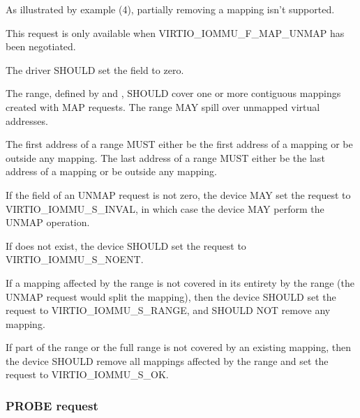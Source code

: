As illustrated by example (4), partially removing a mapping isn't
supported.

This request is only available when VIRTIO_IOMMU_F_MAP_UNMAP has been
negotiated.


The driver SHOULD set the  field to zero.

The range, defined by  and , SHOULD
cover one or more contiguous mappings created with MAP requests. The range
MAY spill over unmapped virtual addresses.

The first address of a range MUST either be the first address of a mapping
or be outside any mapping. The last address of a range MUST either be the
last address of a mapping or be outside any mapping.


If the  field of an UNMAP request is not zero, the device
MAY set the request  to VIRTIO_IOMMU_S_INVAL, in which case
the device MAY perform the UNMAP operation.

If  does not exist, the device SHOULD set the request
 to VIRTIO_IOMMU_S_NOENT.

If a mapping affected by the range is not covered in its entirety by the
range (the UNMAP request would split the mapping), then the device SHOULD
set the request  to VIRTIO_IOMMU_S_RANGE, and SHOULD NOT
remove any mapping.

If part of the range or the full range is not covered by an existing
mapping, then the device SHOULD remove all mappings affected by the range
and set the request  to VIRTIO_IOMMU_S_OK.

\subsubsection{PROBE request}\label{sec:Device Types / IOMMU Device / Device operations / PROBE request}

